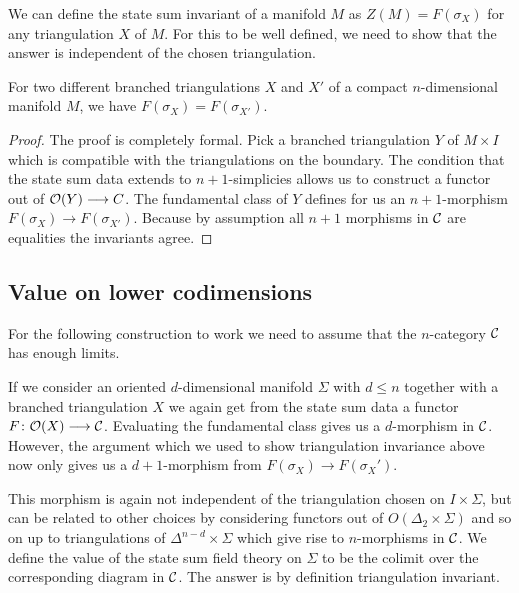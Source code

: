 We can define the state sum invariant of a manifold $M$ as $Z(M)=F(\sigma_X)$ for any triangulation $X$ of $M$.
For this to be well defined, we need to show that the answer is independent of the chosen triangulation.

\begin{theorem}
	For two different branched triangulations $X$ and $X'$ of a compact $n$-dimensional manifold $M$, we have $F(\sigma_X)=F(\sigma_{X'})$.
\end{theorem}

\begin{proof}
	The proof is completely formal.
	Pick a branched triangulation $Y$ of $M\times I$ which is compatible with the triangulations on the boundary.
	The condition that the state sum data extends to $n+1$-simplicies allows us to construct a functor out of $\mathcal{O}(Y)\longrightarrow C $.
	The fundamental class of $Y$ defines for us an $n+1$-morphism $F(\sigma_X)\longrightarrow F(\sigma_{X'})$.
	Because by assumption all $n+1$ morphisms in $\mathcal{C}$ are equalities the invariants agree.
\end{proof}

\begin{remark}
\end{remark}

\subsection{Value on lower codimensions}

For the following construction to work we need to assume that the $n$-category $\mathcal{C}$ has enough limits.

If we consider an oriented $d$-dimensional manifold $\Sigma$ with $d\leq n$ together with a  branched triangulation $X$ we again get from the state sum data a functor $F\colon \mathcal{O}(X)\longrightarrow \mathcal{C}$.
Evaluating the fundamental class gives us a $d$-morphism in
$\mathcal{C}$.
However, the argument which we used to show triangulation invariance above now only gives us a $d+1$-morphism from $F(\sigma_X) \longrightarrow F(\sigma_X')$.

This morphism is again not independent of the triangulation chosen on $I\times \Sigma $, but can be related to other choices by considering functors out of $O(\Delta_2 \times \Sigma)$ and so on up to triangulations of $\Delta^{n-d}\times \Sigma $ which give rise to $n$-morphisms in $\mathcal{C}$.
We define the value of the state sum field theory on $\Sigma$ to be the colimit over the corresponding diagram in $\mathcal{C}$.
The answer is by definition triangulation invariant.


